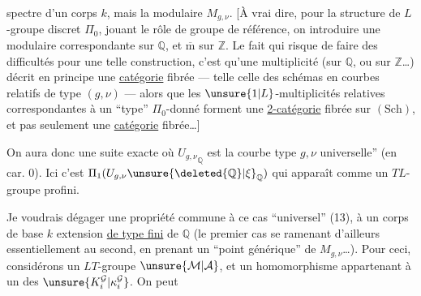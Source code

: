 spectre d'un corps $k$, mais la   modulaire $M_{g,\nu}$. [À vrai dire, pour la structure de $L$-groupe discret $\Pi_0$, jouant le rôle de groupe de référence, on   introduire une   modulaire correspondante sur $\mathbb{Q}$, et $\overline{\mathrm m}$ sur $\mathbb{Z}$. Le fait qui risque de faire des difficultés  pour une telle construction, c'est qu'une multiplicité  (sur $\mathbb{Q}$, ou sur $\mathbb{Z}$\ldots) décrit en principe une \uline{catégorie} fibrée --- telle celle des schémas en courbes relatifs de type $(g,\nu)$ --- alors que les $\unsure{1|L}$-multiplicités relatives correspondantes à un ``type'' $\Pi_0$-donné forment une \uline{2-catégorie}  fibrée sur $(\mathrm{Sch})$, et pas seulement une \uline{catégorie} fibrée\ldots]


On aura donc une suite exacte
où ${U_{g,\nu}}_{\mathbb{Q}}$ est la courbe  type $g,\nu$ universelle'' (en car. $0$). Ici c'est $\Pi_1(U_{g,\nu}\unsure{\deleted{\mathbb{Q}}|\xi}_{\mathbb{Q}})$ qui apparaît comme un $TL$-groupe profini.

Je voudrais dégager une propriété commune à ce cas ``universel'' (13),    à un corps de base $k$ extension \uline{de type fini} de $\mathbb{Q}$ (le premier cas se ramenant d'ailleurs essentiellement au second, en prenant un ``point générique'' de $M_{g,\nu}$\ldots). Pour ceci, considérons un $LT$-groupe $\unsure{\mathcal{M}|\mathcal{A}}$, et un  homomorphisme
appartenant à un des $\unsure{K_i^{\mathcal{G}}|\kappa_i^{\mathcal{G}}}$. On peut

